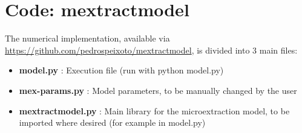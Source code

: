 \documentclass[final,1p,times]{elsarticle}
\begin{document}
\section{Code: mextractmodel}

The numerical implementation, available via \url{https://github.com/pedrospeixoto/mextractmodel}, is divided into 3 main files:
\begin{itemize}
\item  \textbf{model.py} : Execution file (run with python model.py)
\item \textbf{mex-params.py} : Model parameters, to be manually changed by the user
\item \textbf{mextractmodel.py} : Main library for the microextraction model, to be imported where desired (for example in model.py)
\end{itemize}






 






\end{document}
